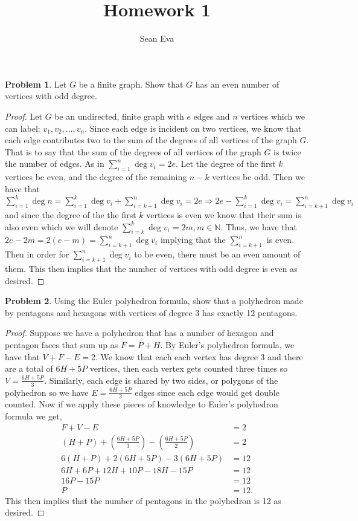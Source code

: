\documentclass[11pt]{article}
\title{Homework 1}
\author{Sean Eva}
\theoremstyle{definition}
\newtheorem{problem}{Problem}
\newcommand{\N}{\mathbb{N}}
\begin{document}
\maketitle

\begin{problem}
Let $G$ be a finite graph. Show that $G$ has an even number of vertices with odd degree.
\end{problem}
\begin{proof}
Let $G$ be an undirected, finite graph with $e$ edges and $n$ vertices which we can label: $v_1, v_2, ..., v_n$. Since each edge is incident on two vertices, we know that each edge contributes two to the sum of the degrees of all vertices of the graph $G$. That is to say that the sum of the degrees of all vertices of the graph $G$ is twice the number of edges. As in $\sum_{i = 1}^n \deg{v_i} = 2e$. Let the degree of the first $k$ vertices be even, and the degree of the remaining $n - k$ vertices be odd. Then we have that $\sum_{i = 1}^k \deg{n} = \sum_{i = 1}^k \deg{v_i} + \sum_{i = k + 1}^n \deg{v_i} = 2e \Rightarrow 2e - \sum_{i = 1}^k \deg{v_i} = \sum_{i = k + 1}^n \deg{v_i}$ and since the degree of the the first $k$ vertices is even we know that their sum is also even which we will denote $\sum_{i = k}^k\deg{v_i} = 2m, m \in \N$. Thus, we have that $2e - 2m = 2(e - m) = \sum_{i = k + 1}^n \deg{v_i}$ implying that the $\sum_{i = k + 1}^n$ is even. Then in order for $\sum_{i = k + 1}^n\deg{v_i}$ to be even, there must be an even amount of them. This then implies that the number of vertices with odd degree is even as desired.
\end{proof}
\pagebreak

\begin{problem}
    Using the Euler polyhedron formula, show that a polyhedron made by pentagons and hexagons with vertices of degree 3 has exactly 12 pentagons.
\end{problem}
\begin{proof}
    Suppose we have a polyhedron that has a number of hexagon and pentagon faces that sum up as $F = P + H$. By Euler's polyhedron formula, we have that $V + F - E = 2$. We know that each each vertex has degree $3$ and there are a total of $6H + 5P$ vertices, then each vertex gets counted three times so $V = \frac{6H + 5P}{3}$. Similarly, each edge is shared by two sides, or polygons of the polyhedron so we have $E = \frac{6H + 5P}{2}$ edges since each edge would get double counted. Now if we apply these pieces of knowledge to Euler's polyhedron formula we get,
    \begin{align*}
        F + V - E &= 2\\
        (H + P) + (\frac{6H + 5P}{3}) - (\frac{6H + 5P}{2}) &= 2\\
        6(H + P) + 2(6H + 5P) - 3(6H + 5P) &= 12\\
        6H + 6P + 12H + 10P - 18H - 15P &= 12\\
        16P - 15P &= 12\\
        P &= 12.
    \end{align*} This then implies that the number of pentagons in the polyhedron is 12 as desired.
\end{proof}
\clearpage
\end{document}
